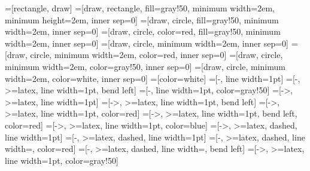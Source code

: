 \newcommand{\nodesize}{2em}
\newcommand{\edgeunit}{2.5*\nodesize}
=[rectangle, draw]
=[draw, rectangle, fill=gray!50, minimum width=\nodesize, minimum height=\nodesize, inner sep=0]
=[draw, circle, fill=gray!50, minimum width=\nodesize, inner sep=0]
=[draw, circle, color=red, fill=gray!50, minimum width=\nodesize, inner sep=0]
=[draw, circle, minimum width=\nodesize, inner sep=0]
=[draw, circle, minimum width=\nodesize, color=red, inner sep=0]
=[draw, circle, minimum width=\nodesize, color=gray!50, inner sep=0]
=[draw, circle, minimum width=\nodesize, color=white, inner sep=0]
=[color=white]
=[-, line width=1pt]
=[-, >=latex, line width=1pt, bend left]
=[-, line width=1pt, color=gray!50]
=[->, >=latex, line width=1pt]
=[->, >=latex, line width=1pt, bend left]
=[->, >=latex, line width=1pt, color=red]
=[->, >=latex, line width=1pt, bend left, color=red]
=[->, >=latex, line width=1pt, color=blue]
=[->, >=latex, dashed, line width=1pt]
=[-, >=latex, dashed, line width=1pt]
=[-, >=latex, dashed, line width=\edgewidth, color=red]
=[-, >=latex, dashed, line width=\edgewidth, bend left]
=[->, >=latex, line width=1pt, color=gray!50]
